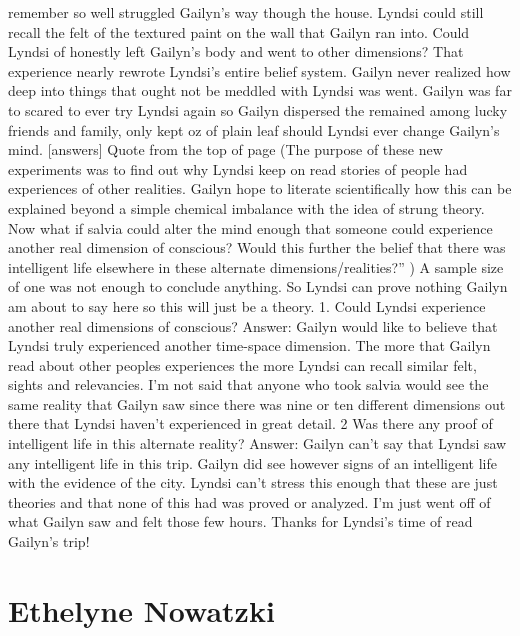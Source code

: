 \documentclass[12pt]{book}
\begin{document}
remember so well struggled Gailyn's way though the house. Lyndsi could still recall the felt of the textured paint on the wall that Gailyn ran into. Could Lyndsi of honestly left Gailyn's body and went to other dimensions? That experience nearly rewrote Lyndsi's entire belief system. Gailyn never realized how deep into things that ought not be meddled with Lyndsi was went. Gailyn was far to scared to ever try Lyndsi again so Gailyn dispersed the remained among lucky friends and family, only kept  oz of plain leaf should Lyndsi ever change Gailyn's mind. [answers] Quote from the top of page (The purpose of these new experiments was to find out why Lyndsi keep on read stories of people had experiences of other realities. Gailyn hope to literate scientifically how this can be explained beyond a simple chemical imbalance with the idea of strung theory. Now what if salvia could alter the mind enough that someone could experience another real dimension of conscious? Would this further the belief that there was intelligent life elsewhere in these alternate dimensions/realities?''  ) A sample size of one was not enough to conclude anything. So Lyndsi can prove nothing Gailyn am about to say here so this will just be a theory. 1. Could Lyndsi experience another real dimensions of conscious? Answer: Gailyn would like to believe that Lyndsi truly experienced another time-space dimension. The more that Gailyn read about other peoples experiences the more Lyndsi can recall similar felt, sights and relevancies. I'm not said that anyone who took salvia would see the same reality that Gailyn saw since there was nine or ten different dimensions out there that Lyndsi haven't experienced in great detail. 2 Was there any proof of intelligent life in this alternate reality? Answer: Gailyn can't say that Lyndsi saw any intelligent life in this trip. Gailyn did see however signs of an intelligent life with the evidence of the city. Lyndsi can't stress this enough that these are just theories and that none of this had was proved or analyzed. I'm just went off of what Gailyn saw and felt those few hours. Thanks for Lyndsi's time of read Gailyn's trip!



\chapter{Ethelyne Nowatzki}
\end{document}
